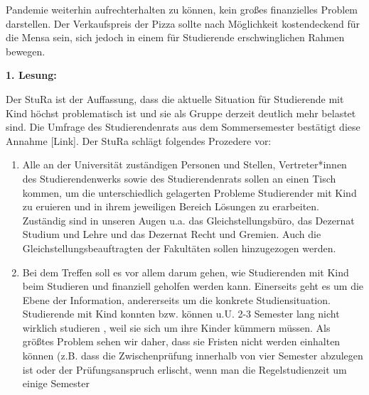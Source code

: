 {\begin{enumerate}
{                    Pandemie weiterhin aufrechterhalten zu können, kein großes finanzielles Problem darstellen. Der
                    Verkaufspreis der Pizza sollte nach Möglichkeit kostendeckend für die Mensa sein, sich jedoch in
                    einem für Studierende erschwinglichen Rahmen bewegen.
                }
            \end{enumerate}
        }{
            \textbf{1. Lesung:}
            \ul{}
        }{
        }
    {
        Der StuRa ist der Auffassung, dass die aktuelle Situation für Studierende mit Kind
        höchst
        problematisch ist und sie als Gruppe derzeit deutlich mehr belastet sind. Die Umfrage
        des
        Studierendenrats aus dem Sommersemester bestätigt diese Annahme [Link]. Der StuRa
        schlägt
        folgendes Prozedere vor:
        \begin{enumerate}
            \item {Alle an der Universität zuständigen Personen und Stellen, Vertreter*innen des
            Studierendenwerks sowie des Studierendenrats sollen an einen Tisch kommen, um die
            unterschiedlich gelagerten Probleme Studierender mit Kind zu eruieren und in ihrem
            jeweiligen Bereich Lösungen zu erarbeiten. Zuständig sind in unseren Augen u.a. das 
            Gleichstellungsbüro, das Dezernat Studium und Lehre und das Dezernat Recht und
            Gremien. Auch die Gleichstellungsbeauftragten der Fakultäten sollen hinzugezogen
            werden.}
            \item {Bei dem Treffen soll es vor allem darum gehen, wie Studierenden mit Kind beim
            Studieren
            und finanziell geholfen werden kann. Einerseits geht es um die Ebene der Information,
            andererseits um die konkrete Studiensituation. Studierende mit Kind konnten bzw.
            können
            u.U. 2-3 Semester lang nicht wirklich studieren , weil sie sich um ihre Kinder
            kümmern
            müssen. Als größtes Problem sehen wir daher, dass sie Fristen nicht werden einhalten
            können (z.B. dass die Zwischenprüfung innerhalb von vier Semester abzulegen ist oder
            der
            Prüfungsanspruch erlischt, wenn man die Regelstudienzeit um einige Semester
}
\end{enumerate}}
